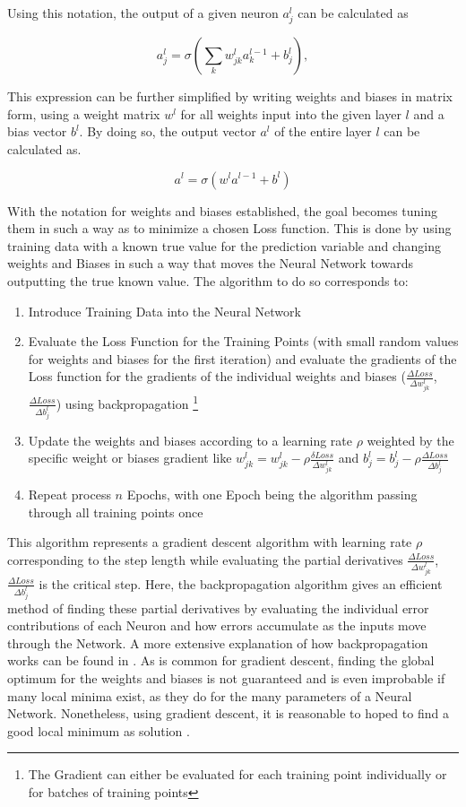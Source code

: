  Using this notation, the output of a given neuron $a_j^l$ can be calculated as 
 
 $$
 a_j^l = \sigma\left( \sum_k w_{jk}^l a_k^{l-1} + b_j^l \right),
 $$
 
 This expression can be further simplified by writing weights and biases in matrix form, using a weight matrix $w^l$ for all weights input into the given layer $l$ and a bias vector $b^l$. By doing so, the output vector $a^l$ of the entire layer $l$ can be calculated as.
 
 $$a^l = \sigma (w^la^{l-1}+b^l)$$
 
With the notation for weights and biases established, the goal becomes tuning them in such a way as to minimize a chosen Loss function. This is done by using training data with a known true value for the prediction variable and changing weights and Biases in such a way that moves the Neural Network towards outputting the true known value. 
The algorithm to do so corresponds to: 

\begin{enumerate}
	\item Introduce Training Data into the Neural Network
	\item Evaluate the Loss Function for the Training Points (with small random values for weights and biases for the first iteration) and evaluate the gradients of the Loss function for the gradients of the individual weights and biases ($\frac{\Delta Loss}{\Delta w_{jk}^l}$, $\frac{\Delta Loss}{\Delta b_j^l}$) using backpropagation  \footnote{The Gradient can either be evaluated for each training point individually or for batches of training points}
	\item Update the weights and biases according to a learning rate $\rho$ weighted by the specific weight or biases gradient like $w_{jk}^l =w_{jk}^l - \rho \frac{\delta Loss}{\Delta w_{jk}^l}$ and $b_j^l =b_j^l - \rho \frac{\Delta Loss}{\Delta b_j^l}$ 
	\item Repeat process $n$ Epochs, with one Epoch being the algorithm passing through all training points once
\end{enumerate}

This algorithm represents a gradient descent algorithm with learning rate  $\rho$ corresponding to the step length while evaluating the partial derivatives $\frac{\Delta Loss}{\Delta w_{jk}^l}$, $\frac{\Delta Loss}{\Delta b_j^l}$ is the critical step. Here, the backpropagation algorithm gives an efficient method of finding these partial derivatives by evaluating the individual error contributions of each Neuron and how errors accumulate as the inputs move through the Network. A more extensive explanation of how backpropagation works can be found in \cite{nielsen2015neuralChap2}. As is common for gradient descent, finding the global optimum for the weights and biases is not guaranteed and is even improbable if many local minima exist, as they do for the many parameters of a Neural Network. Nonetheless, using gradient descent, it is reasonable to hoped to find a good local minimum as solution \cite{James2023} \cite{nielsen2015neuralChap2}.

